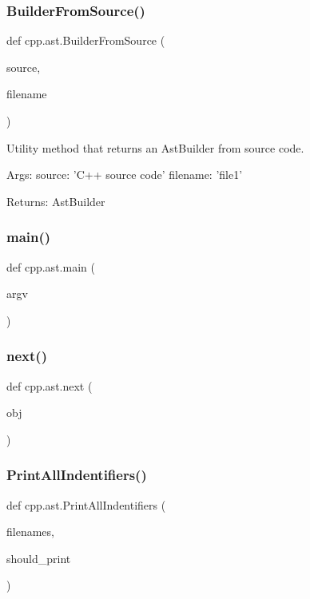 \subsubsection{\texorpdfstring{BuilderFromSource()}{BuilderFromSource()}}
{\footnotesize\ttfamily def cpp.\+ast.\+Builder\+From\+Source (\begin{DoxyParamCaption}\item[{}]{source,  }\item[{}]{filename }\end{DoxyParamCaption})}

\begin{DoxyVerb}Utility method that returns an AstBuilder from source code.

Args:
  source: 'C++ source code'
  filename: 'file1'

Returns:
  AstBuilder
\end{DoxyVerb}
 \mbox{\label{namespacecpp_1_1ast_acd29cc27c3bff13bf3e055575b8e958a}} 
\subsubsection{\texorpdfstring{main()}{main()}}
{\footnotesize\ttfamily def cpp.\+ast.\+main (\begin{DoxyParamCaption}\item[{}]{argv }\end{DoxyParamCaption})}

\mbox{\label{namespacecpp_1_1ast_a39ad8261fef5e0a7c1c17c510541b66f}} 
\subsubsection{\texorpdfstring{next()}{next()}}
{\footnotesize\ttfamily def cpp.\+ast.\+next (\begin{DoxyParamCaption}\item[{}]{obj }\end{DoxyParamCaption})}

\mbox{\label{namespacecpp_1_1ast_abc501124095357c1cf56eaf10e1df327}} 
\subsubsection{\texorpdfstring{PrintAllIndentifiers()}{PrintAllIndentifiers()}}
{\footnotesize\ttfamily def cpp.\+ast.\+Print\+All\+Indentifiers (\begin{DoxyParamCaption}\item[{}]{filenames,  }\item[{}]{should\+\_\+print }\end{DoxyParamCaption})}

